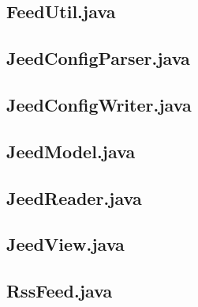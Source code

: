 \documentclass[a4paper, 12pt]{article}
\begin{document}
\newpage
\subsection{FeedUtil.java}\label{FeedUtil.java}
\begin{footnotesize}
  
\end{footnotesize}

\newpage
\subsection{JeedConfigParser.java}\label{JeedConfigParser.java}
\begin{footnotesize}
  
\end{footnotesize}

\newpage
\subsection{JeedConfigWriter.java}\label{JeedConfigWriter.java}
\begin{footnotesize}
  
\end{footnotesize}

\newpage
\subsection{JeedModel.java}\label{JeedModel.java}
\begin{footnotesize}
  
\end{footnotesize}

\newpage
\subsection{JeedReader.java}\label{JeedReader.java}
\begin{footnotesize}
  
\end{footnotesize}

\newpage
\subsection{JeedView.java}\label{JeedView.java}
\begin{footnotesize}
  
\end{footnotesize}

\newpage
\subsection{RssFeed.java}\label{RssFeed.java}
\begin{footnotesize}
  
\end{footnotesize}
\end{document}
